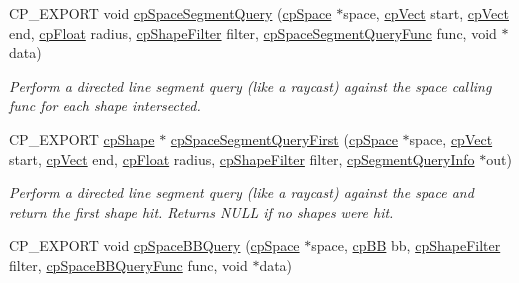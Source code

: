 \begin{DoxyCompactItemize}
\mbox{\label{group__cp_space_ga16b9a1e185bea2680a1bc6c798f86049}} 
C\+P\+\_\+\+E\+X\+P\+O\+RT void \mbox{\hyperlink{group__cp_space_ga16b9a1e185bea2680a1bc6c798f86049}{cp\+Space\+Segment\+Query}} (\mbox{\hyperlink{structcp_space}{cp\+Space}} $\ast$space, \mbox{\hyperlink{structcp_vect}{cp\+Vect}} start, \mbox{\hyperlink{structcp_vect}{cp\+Vect}} end, \mbox{\hyperlink{group__basic_types_gac1ed65573e035bf892505768c852d8d3}{cp\+Float}} radius, \mbox{\hyperlink{structcp_shape_filter}{cp\+Shape\+Filter}} filter, \mbox{\hyperlink{group__cp_space_ga9046beaeba5728c5e954f0f1dc2ae130}{cp\+Space\+Segment\+Query\+Func}} func, void $\ast$data)
\begin{DoxyCompactList}\small\item\em Perform a directed line segment query (like a raycast) against the space calling {\ttfamily func} for each shape intersected. \end{DoxyCompactList}\item 
\mbox{\label{group__cp_space_ga7e1994e5d086e002e623a42642d7ea91}} 
C\+P\+\_\+\+E\+X\+P\+O\+RT \mbox{\hyperlink{structcp_shape}{cp\+Shape}} $\ast$ \mbox{\hyperlink{group__cp_space_ga7e1994e5d086e002e623a42642d7ea91}{cp\+Space\+Segment\+Query\+First}} (\mbox{\hyperlink{structcp_space}{cp\+Space}} $\ast$space, \mbox{\hyperlink{structcp_vect}{cp\+Vect}} start, \mbox{\hyperlink{structcp_vect}{cp\+Vect}} end, \mbox{\hyperlink{group__basic_types_gac1ed65573e035bf892505768c852d8d3}{cp\+Float}} radius, \mbox{\hyperlink{structcp_shape_filter}{cp\+Shape\+Filter}} filter, \mbox{\hyperlink{structcp_segment_query_info}{cp\+Segment\+Query\+Info}} $\ast$out)
\begin{DoxyCompactList}\small\item\em Perform a directed line segment query (like a raycast) against the space and return the first shape hit. Returns N\+U\+LL if no shapes were hit. \end{DoxyCompactList}\item 
C\+P\+\_\+\+E\+X\+P\+O\+RT void \mbox{\hyperlink{group__cp_space_ga09e4737a3b33755ee20066297138b64e}{cp\+Space\+B\+B\+Query}} (\mbox{\hyperlink{structcp_space}{cp\+Space}} $\ast$space, \mbox{\hyperlink{structcp_b_b}{cp\+BB}} bb, \mbox{\hyperlink{structcp_shape_filter}{cp\+Shape\+Filter}} filter, \mbox{\hyperlink{group__cp_space_ga02779238e9b8c07797aae6139fad203c}{cp\+Space\+B\+B\+Query\+Func}} func, void $\ast$data)
\item 

\end{DoxyCompactItemize}
